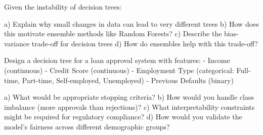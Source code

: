 \documentclass{article}
\newcounter{exercise}
\begin{document}
\begin{tcolorbox}[colback=gray!5!white,colframe=gray!75!black,title=Problem \stepcounter{exercise}: Ensemble Motivation]

Given the instability of decision trees:

a) Explain why small changes in data can lead to very different trees
b) How does this motivate ensemble methods like Random Forests?
c) Describe the bias-variance trade-off for decision trees
d) How do ensembles help with this trade-off?
\end{tcolorbox}

\begin{tcolorbox}[colback=gray!5!white,colframe=gray!75!black,title=Problem \stepcounter{exercise}: Real-World Application]

Design a decision tree for a loan approval system with features:
- Income (continuous)
- Credit Score (continuous) 
- Employment Type (categorical: Full-time, Part-time, Self-employed, Unemployed)
- Previous Defaults (binary)

a) What would be appropriate stopping criteria?
b) How would you handle class imbalance (more approvals than rejections)?
c) What interpretability constraints might be required for regulatory compliance?
d) How would you validate the model's fairness across different demographic groups?
\end{tcolorbox}
\end{document}
